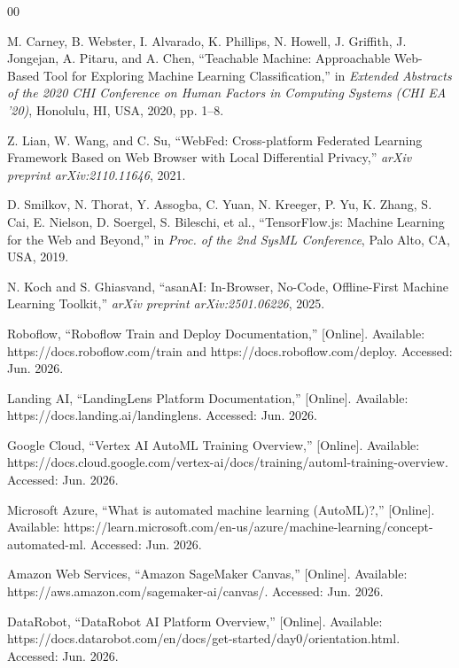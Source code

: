 \documentclass[conference]{IEEEtran}
\begin{document}
\begin{thebibliography}{00}

M. Carney, B. Webster, I. Alvarado, K. Phillips, N. Howell, J. Griffith, J. Jongejan, A. Pitaru, and A. Chen, ``Teachable Machine: Approachable Web-Based Tool for Exploring Machine Learning Classification,'' in \textit{Extended Abstracts of the 2020 CHI Conference on Human Factors in Computing Systems (CHI EA '20)}, Honolulu, HI, USA, 2020, pp. 1--8.

Z. Lian, W. Wang, and C. Su, ``WebFed: Cross-platform Federated Learning Framework Based on Web Browser with Local Differential Privacy,'' \textit{arXiv preprint arXiv:2110.11646}, 2021.

D. Smilkov, N. Thorat, Y. Assogba, C. Yuan, N. Kreeger, P. Yu, K. Zhang, S. Cai, E. Nielson, D. Soergel, S. Bileschi, et al., ``TensorFlow.js: Machine Learning for the Web and Beyond,'' in \textit{Proc. of the 2nd SysML Conference}, Palo Alto, CA, USA, 2019.

N. Koch and S. Ghiasvand, ``asanAI: In-Browser, No-Code, Offline-First Machine Learning Toolkit,'' \textit{arXiv preprint arXiv:2501.06226}, 2025.

Roboflow, ``Roboflow Train and Deploy Documentation,'' [Online]. Available: https://docs.roboflow.com/train and https://docs.roboflow.com/deploy. Accessed: Jun. 2026.

Landing AI, ``LandingLens Platform Documentation,'' [Online]. Available: https://docs.landing.ai/landinglens. Accessed: Jun. 2026.

Google Cloud, ``Vertex AI AutoML Training Overview,'' [Online]. Available: https://docs.cloud.google.com/vertex-ai/docs/training/automl-training-overview. Accessed: Jun. 2026.

Microsoft Azure, ``What is automated machine learning (AutoML)?,'' [Online]. Available: https://learn.microsoft.com/en-us/azure/machine-learning/concept-automated-ml. Accessed: Jun. 2026.

Amazon Web Services, ``Amazon SageMaker Canvas,'' [Online]. Available: https://aws.amazon.com/sagemaker-ai/canvas/. Accessed: Jun. 2026.

DataRobot, ``DataRobot AI Platform Overview,'' [Online]. Available: https://docs.datarobot.com/en/docs/get-started/day0/orientation.html. Accessed: Jun. 2026.


\end{thebibliography}
\end{document}
